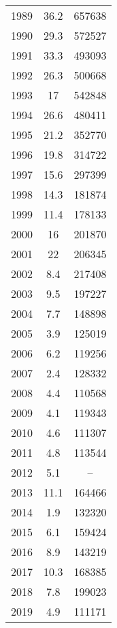 \documentclass[11pt]{book}
\begin{document}
\begin{longtable}[t]{ccc}
1989 & 36.2 & 657638\\
1990 & 29.3 & 572527\\
1991 & 33.3 & 493093\\
1992 & 26.3 & 500668\\
1993 & 17 & 542848\\
1994 & 26.6 & 480411\\
1995 & 21.2 & 352770\\
1996 & 19.8 & 314722\\
1997 & 15.6 & 297399\\
1998 & 14.3 & 181874\\
1999 & 11.4 & 178133\\
2000 & 16 & 201870\\
2001 & 22 & 206345\\
2002 & 8.4 & 217408\\
2003 & 9.5 & 197227\\
2004 & 7.7 & 148898\\
2005 & 3.9 & 125019\\
2006 & 6.2 & 119256\\
2007 & 2.4 & 128332\\
2008 & 4.4 & 110568\\
2009 & 4.1 & 119343\\
2010 & 4.6 & 111307\\
2011 & 4.8 & 113544\\
2012 & 5.1 & --\\
2013 & 11.1 & 164466\\
2014 & 1.9 & 132320\\
2015 & 6.1 & 159424\\
2016 & 8.9 & 143219\\
2017 & 10.3 & 168385\\
2018 & 7.8 & 199023\\
2019 & 4.9 & 111171\\*
\end{longtable}
\clearpage
\end{document}
